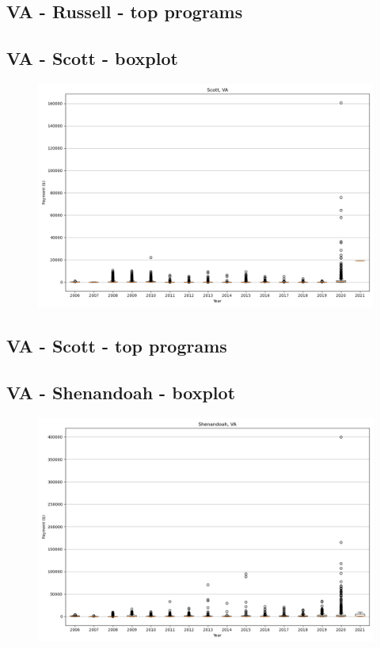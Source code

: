 \subsection*{VA - Russell - top programs}

\newpage
\subsection*{VA - Scott - boxplot}
\begin{figure}[h]
\centering
\includegraphics[width=7in]{../output/boxplots/counties/Scott-VA_boxplot.png}
\end{figure}


\subsection*{VA - Scott - top programs}

\newpage
\subsection*{VA - Shenandoah - boxplot}
\begin{figure}[h]
\centering
\includegraphics[width=7in]{../output/boxplots/counties/Shenandoah-VA_boxplot.png}
\end{figure}


